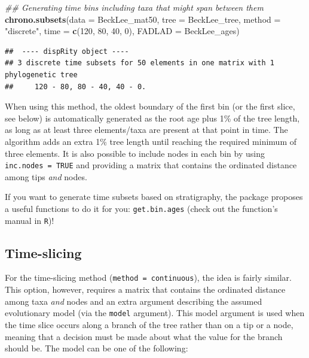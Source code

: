 \documentclass[
]{book}
\newenvironment{Shaded}{\begin{snugshade}}{\end{snugshade}}
\newcommand{\CommentTok}[1]{\textcolor[rgb]{0.56,0.35,0.01}{\textit{#1}}}
\newcommand{\DataTypeTok}[1]{\textcolor[rgb]{0.13,0.29,0.53}{#1}}
\newcommand{\DecValTok}[1]{\textcolor[rgb]{0.00,0.00,0.81}{#1}}
\newcommand{\KeywordTok}[1]{\textcolor[rgb]{0.13,0.29,0.53}{\textbf{#1}}}
\newcommand{\NormalTok}[1]{#1}
\newcommand{\StringTok}[1]{\textcolor[rgb]{0.31,0.60,0.02}{#1}}
\begin{document}
\begin{Shaded}
\begin{Highlighting}[]
\CommentTok{\#\# Generating time bins including taxa that might span between them}
\KeywordTok{chrono.subsets}\NormalTok{(}\DataTypeTok{data =}\NormalTok{ BeckLee\_mat50, }\DataTypeTok{tree =}\NormalTok{ BeckLee\_tree,}
               \DataTypeTok{method =} \StringTok{"discrete"}\NormalTok{,}
               \DataTypeTok{time =} \KeywordTok{c}\NormalTok{(}\DecValTok{120}\NormalTok{, }\DecValTok{80}\NormalTok{, }\DecValTok{40}\NormalTok{, }\DecValTok{0}\NormalTok{), }\DataTypeTok{FADLAD =}\NormalTok{ BeckLee\_ages)}
\end{Highlighting}
\end{Shaded}

\begin{verbatim}
##  ---- dispRity object ---- 
## 3 discrete time subsets for 50 elements in one matrix with 1 phylogenetic tree
##     120 - 80, 80 - 40, 40 - 0.
\end{verbatim}

When using this method, the oldest boundary of the first bin (or the first slice, see below) is automatically generated as the root age plus 1\% of the tree length, as long as at least three elements/taxa are present at that point in time.
The algorithm adds an extra 1\% tree length until reaching the required minimum of three elements.
It is also possible to include nodes in each bin by using \texttt{inc.nodes\ =\ TRUE} and providing a matrix that contains the ordinated distance among tips \emph{and} nodes.

If you want to generate time subsets based on stratigraphy, the package proposes a useful functions to do it for you: \texttt{get.bin.ages} (check out the function's manual in \texttt{R})!

\hypertarget{time-slicing}{%
\subsection{Time-slicing}\label{time-slicing}}

For the time-slicing method (\texttt{method\ =\ continuous}), the idea is fairly similar.
This option, however, requires a matrix that contains the ordinated distance among taxa \emph{and} nodes and an extra argument describing the assumed evolutionary model (via the \texttt{model} argument).
This model argument is used when the time slice occurs along a branch of the tree rather than on a tip or a node, meaning that a decision must be made about what the value for the branch should be.
The model can be one of the following:
\end{document}

